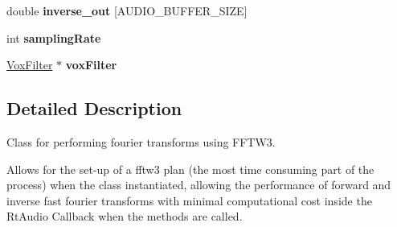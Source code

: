 \begin{DoxyCompactItemize}
\item 
\hypertarget{classfft_a290d4177db41a835118d5e0003ec7e2f}{double {\bfseries inverse\-\_\-out} \mbox{[}A\-U\-D\-I\-O\-\_\-\-B\-U\-F\-F\-E\-R\-\_\-\-S\-I\-Z\-E\mbox{]}}\label{classfft_a290d4177db41a835118d5e0003ec7e2f}

\item 
\hypertarget{classfft_add70853a9fc0ac681a974a8e1a40dfd8}{int {\bfseries sampling\-Rate}}\label{classfft_add70853a9fc0ac681a974a8e1a40dfd8}

\item 
\hypertarget{classfft_a3eda9964a8016b8683b5b5581fb90636}{\hyperlink{classVoxFilter}{Vox\-Filter} $\ast$ {\bfseries vox\-Filter}}\label{classfft_a3eda9964a8016b8683b5b5581fb90636}

\end{DoxyCompactItemize}


\subsection{Detailed Description}
Class for performing fourier transforms using F\-F\-T\-W3. 

Allows for the set-\/up of a fftw3 plan (the most time consuming part of the process) when the class instantiated, allowing the performance of forward and inverse fast fourier transforms with minimal computational cost inside the Rt\-Audio Callback when the methods are called. 


